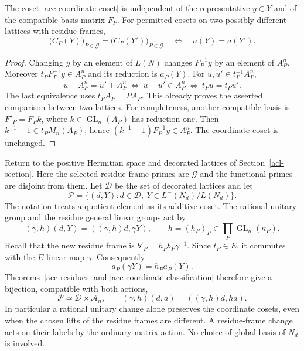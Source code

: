 \begin{proposition}\label{acc-coordinate-classification}
The coset \eqref{acc-coordinate-coset} is independent of the
representative $y\in Y$ and of the compatible basis matrix $F_P$.
For permitted cosets on two possibly different lattices with
residue frames,
\[
 \bigl(C_P(Y)\bigr)_{P\in\mathcal G}
   =\bigl(C_P(Y')\bigr)_{P\in\mathcal G}
                   \quad\Longleftrightarrow\quad a(Y)=a(Y').
\]
\end{proposition}

\begin{proof}
Changing $y$ by an element of $L(N)$ changes $F_P^{-1}y$ by
an element of $A_P^n$.  Moreover
$t_PF_P^{-1}y\in A_P^n$ and its reduction is $a_P(Y)$.
For $u,u'\in t_P^{-1}A_P^n$,
\[
 u+A_P^n=u'+A_P^n
   \ \Longleftrightarrow\ u-u'\in A_P^n
   \ \Longleftrightarrow\ \overline{t_Pu}=\overline{t_Pu'}.
\]
The last equivalence uses $t_PA_P=PA_P$.
This already proves the asserted comparison between two lattices.
For completeness, another compatible basis is $F'_P=F_Pk$,
where $k\in\operatorname{GL}_n(A_P)$ has reduction one.
Then $k^{-1}-1\in t_PM_n(A_P)$; hence
$(k^{-1}-1)F_P^{-1}y\in A_P^n$.
The coordinate coset is unchanged.
\end{proof}

Return to the positive Hermitian space and decorated lattices of
Section~\ref{acl-section}.  Here the selected residue-frame primes
are $\mathcal G$ and the functional primes are disjoint from them.
Let $\mathscr D$ be the set of decorated lattices and let
\[
                   \mathscr P=\{(d,Y):d\in\mathscr D,
                        \ Y\in L^-(N_d)/L(N_d)\}.
\]
The notation treats a quotient element as its additive coset.
The rational unitary group and the residue general linear groups act by
\[
 (\gamma,h)(d,Y)=((\gamma,h)d,\gamma Y),
 \qquad h=(h_P)_P\in\prod_P\operatorname{GL}_n(\kappa_P).
\]
Recall that the new residue frame is
$b'_P=h_Pb_P\gamma^{-1}$.
Since $t_P\in E$, it commutes with the $E$-linear map $\gamma$.
Consequently
\begin{equation}\label{acc-equivariance}
                a_P(\gamma Y)=h_Pa_P(Y).
\end{equation}
Theorems~\ref{acc-residues} and \ref{acc-coordinate-classification}
therefore give a bijection, compatible with both actions,
\begin{equation}\label{acc-product-description}
 \mathscr P\simeq\mathscr D\times\mathcal A_n,
 \qquad
 (\gamma,h)(d,a)=((\gamma,h)d,ha).
\end{equation}
In particular a rational unitary change alone preserves the coordinate
cosets, even when the chosen lifts of the residue frames are different.
A residue-frame change acts on their labels by the ordinary matrix
action.  No choice of global basis of $N_d$ is involved.

